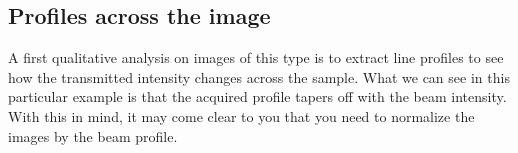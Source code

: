 \documentclass[letterpaper,10pt,english]{sphinxmanual}
\begin{document}
\noindent{}


\subsection{Profiles across the image}
\label{\detokenize{04-BasicSegmentation:profiles-across-the-image}}
\sphinxAtStartPar
A first qualitative analysis on images of this type is to extract line profiles to see how the transmitted intensity changes across the sample. What we can see in this particular example is that the acquired profile tapers off with the beam intensity. With this in mind, it may come clear to you that you need to normalize the images by the beam profile.

\begin{sphinxVerbatim}[commandchars=\\\{\}]
       
\PYG{p}{[}\PYG{p}{]} \PYG{p}{[}\PYG{p}{]}\PYG{p}{[}\PYG{p}{]}\PYG{p}{[}\PYG{p}{]}
\PYG{p}{[}\PYG{p}{]}\PYG{p}{[}\PYG{p}{[}\PYG{p}{]}\PYG{p}{]}   
\PYG{p}{[}\PYG{p}{]}\PYG{p}{[}\PYG{p}{[}\PYG{p}{]}\PYG{p}{]}   

\end{sphinxVerbatim}
\end{document}

